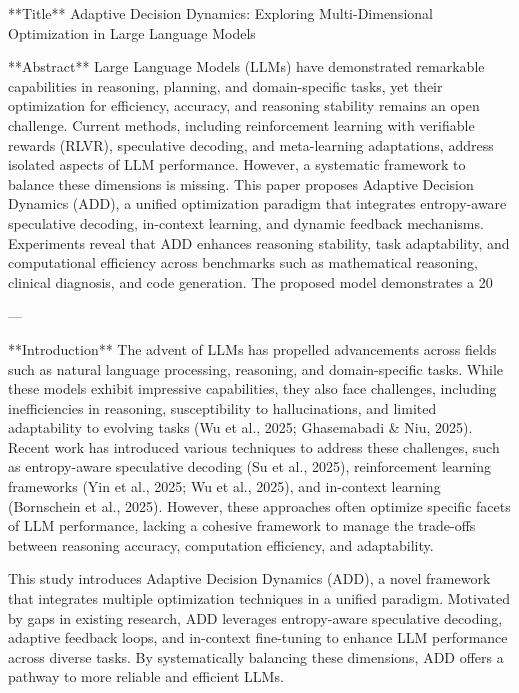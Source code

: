 **Title**  
Adaptive Decision Dynamics: Exploring Multi-Dimensional Optimization in Large Language Models  

**Abstract**  
Large Language Models (LLMs) have demonstrated remarkable capabilities in reasoning, planning, and domain-specific tasks, yet their optimization for efficiency, accuracy, and reasoning stability remains an open challenge. Current methods, including reinforcement learning with verifiable rewards (RLVR), speculative decoding, and meta-learning adaptations, address isolated aspects of LLM performance. However, a systematic framework to balance these dimensions is missing. This paper proposes Adaptive Decision Dynamics (ADD), a unified optimization paradigm that integrates entropy-aware speculative decoding, in-context learning, and dynamic feedback mechanisms. Experiments reveal that ADD enhances reasoning stability, task adaptability, and computational efficiency across benchmarks such as mathematical reasoning, clinical diagnosis, and code generation. The proposed model demonstrates a 20%

---

**Introduction**  
The advent of LLMs has propelled advancements across fields such as natural language processing, reasoning, and domain-specific tasks. While these models exhibit impressive capabilities, they also face challenges, including inefficiencies in reasoning, susceptibility to hallucinations, and limited adaptability to evolving tasks (Wu et al., 2025; Ghasemabadi & Niu, 2025). Recent work has introduced various techniques to address these challenges, such as entropy-aware speculative decoding (Su et al., 2025), reinforcement learning frameworks (Yin et al., 2025; Wu et al., 2025), and in-context learning (Bornschein et al., 2025). However, these approaches often optimize specific facets of LLM performance, lacking a cohesive framework to manage the trade-offs between reasoning accuracy, computation efficiency, and adaptability.

This study introduces Adaptive Decision Dynamics (ADD), a novel framework that integrates multiple optimization techniques in a unified paradigm. Motivated by gaps in existing research, ADD leverages entropy-aware speculative decoding, adaptive feedback loops, and in-context fine-tuning to enhance LLM performance across diverse tasks. By systematically balancing these dimensions, ADD offers a pathway to more reliable and efficient LLMs.  


